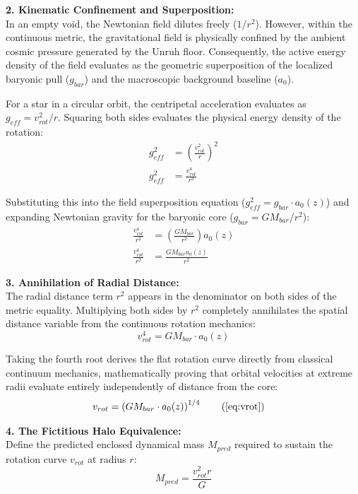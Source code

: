 \documentclass[11pt, a4paper]{article}
\begin{document}
\textbf{2. Kinematic Confinement and Superposition:} \\
In an empty void, the Newtonian field dilutes freely ($1/r^2$). However, within the continuous metric, the gravitational field is physically confined by the ambient cosmic pressure generated by the Unruh floor. Consequently, the active energy density of the field evaluates as the geometric superposition of the localized baryonic pull ($g_{bar}$) and the macroscopic background baseline ($a_0$).

For a star in a circular orbit, the centripetal acceleration evaluates as $g_{eff} = v_{rot}^2/r$. Squaring both sides evaluates the physical energy density of the rotation:
\begin{align}
    g_{eff}^2 &= \left( \frac{v_{rot}^2}{r} \right)^2 \nonumber \\
    g_{eff}^2 &= \frac{v_{rot}^4}{r^2} \nonumber
\end{align}

Substituting this into the field superposition equation ($g_{eff}^2 = g_{bar} \cdot a_0(z)$) and expanding Newtonian gravity for the baryonic core ($g_{bar} = G M_{bar} / r^2$):
\begin{align}
    \frac{v_{rot}^4}{r^2} &= \left( \frac{G M_{bar}}{r^2} \right) a_0(z) \nonumber \\
    \frac{v_{rot}^4}{r^2} &= \frac{G M_{bar} a_0(z)}{r^2} \nonumber
\end{align}

\textbf{3. Annihilation of Radial Distance:} \\
The radial distance term $r^2$ appears in the denominator on both sides of the metric equality. Multiplying both sides by $r^2$ completely annihilates the spatial distance variable from the continuous rotation mechanics:
\begin{equation}
    v_{rot}^4 = G M_{bar} \cdot a_0(z) \nonumber
\end{equation}

Taking the fourth root derives the flat rotation curve directly from classical continuum mechanics, mathematically proving that orbital velocities at extreme radii evaluate entirely independently of distance from the core:
\begin{align}
    v_{rot} &= \left( G M_{bar} \cdot a_0(z) \right)^{1/4} \tag{\ref{eq:vrot}}
\end{align}

\textbf{4. The Fictitious Halo Equivalence:} \\
Define the predicted enclosed dynamical mass $M_{pred}$ required to sustain the rotation curve $v_{rot}$ at radius $r$:
\begin{equation}
    M_{pred} = \frac{v_{rot}^2 r}{G} \nonumber
\end{equation}
\end{document}
